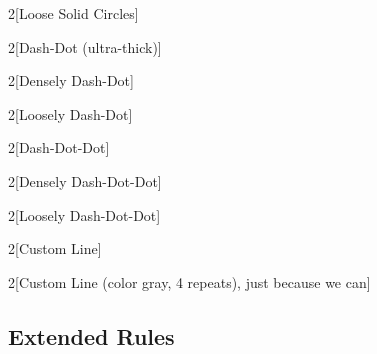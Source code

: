 \documentclass{article}
\begin{document}
\begin{multicols}{2}[Loose Solid Circles]
  \lipsum[1]
\end{multicols}

\begin{multicols}{2}[Dash-Dot (ultra-thick)]
  \lipsum[1]
\end{multicols}

\begin{multicols}{2}[Densely Dash-Dot]
  \lipsum[1]
\end{multicols}

\begin{multicols}{2}[Loosely Dash-Dot]
  \lipsum[1]
\end{multicols}

\begin{multicols}{2}[Dash-Dot-Dot]
  \lipsum[1]
\end{multicols}

\begin{multicols}{2}[Densely Dash-Dot-Dot]
  \lipsum[1]
\end{multicols}

\begin{multicols}{2}[Loosely Dash-Dot-Dot]
  \lipsum[1]
\end{multicols}

\begin{multicols}{2}[Custom Line]
  \lipsum[1-2]
\end{multicols}

\setlength{\columnsep}{50pt}
\begin{multicols}{2}[Custom Line (color gray, 4 repeats), just because we can]
  \lipsum[1-2]
\end{multicols}

\newpage
\subsection*{Extended Rules}
\setlength{\columnsep}{24pt}
\end{document}
